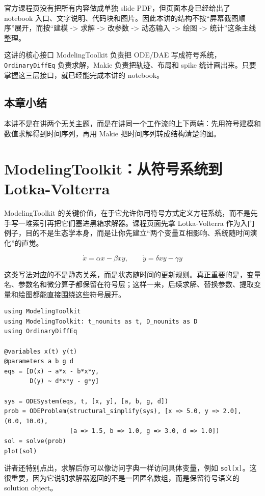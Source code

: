 \documentclass[a4paper]{article}
\begin{document}
官方课程页没有把所有内容做成单独 slide PDF，但页面本身已经给出了 notebook 入口、文字说明、代码块和图片。因此本讲的结构不按“屏幕截图顺序”展开，而按“建模 -> 求解 -> 改参数 -> 动态输入 -> 绘图 -> 统计”这条主线整理。

\begin{knowledgebox}{这讲的核心接口}
ModelingToolkit 负责把 ODE/DAE 写成符号系统，\texttt{OrdinaryDiffEq} 负责求解，Makie 负责把轨迹、布局和 spike 统计画出来。只要掌握这三层接口，就已经能完成本讲的 notebook。
\end{knowledgebox}

\subsection{本章小结}
本讲不是在讲两个无关主题，而是在讲同一个工作流的上下两端：先用符号建模和数值求解得到时间序列，再用 Makie 把时间序列转成结构清楚的图。

\section{ModelingToolkit：从符号系统到 Lotka-Volterra}
ModelingToolkit 的关键价值，在于它允许你用符号方式定义方程系统，而不是先手写一堆索引再把它们塞进黑箱求解器。课程页面先拿 Lotka-Volterra 作为入门例子，目的不是生态学本身，而是让你先建立“两个变量互相影响、系统随时间演化”的直觉。

\begin{equation}
\dot{x} = \alpha x - \beta x y, \qquad
\dot{y} = \delta x y - \gamma y
\end{equation}

这类写法对应的不是静态关系，而是状态随时间的更新规则。真正重要的是，变量名、参数名和微分算子都保留在符号层；这样一来，后续求解、替换参数、提取变量和绘图都能直接围绕这些符号展开。

\begin{lstlisting}[caption={ModelingToolkit 的最小工作流}]
using ModelingToolkit
using ModelingToolkit: t_nounits as t, D_nounits as D
using OrdinaryDiffEq

@variables x(t) y(t)
@parameters a b g d
eqs = [D(x) ~ a*x - b*x*y,
       D(y) ~ d*x*y - g*y]

sys = ODESystem(eqs, t, [x, y], [a, b, g, d])
prob = ODEProblem(structural_simplify(sys), [x => 5.0, y => 2.0], (0.0, 10.0),
                  [a => 1.5, b => 1.0, g => 3.0, d => 1.0])
sol = solve(prob)
plot(sol)
\end{lstlisting}

讲者还特别点出，求解后你可以像访问字典一样访问具体变量，例如 \texttt{sol[x]}。这很重要，因为它说明求解器返回的不是一团匿名数组，而是保留符号语义的 solution object。
\end{document}
